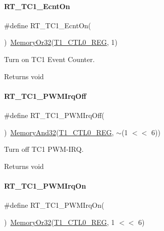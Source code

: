 \paragraph{\texorpdfstring{R\+T\+\_\+\+T\+C1\+\_\+\+Ecnt\+On}{RT\_TC1\_EcntOn}}
{\footnotesize\ttfamily \#define R\+T\+\_\+\+T\+C1\+\_\+\+Ecnt\+On(\begin{DoxyParamCaption}{ }\end{DoxyParamCaption})~\mbox{\hyperlink{a00026_a27874a97deab7cecdde5ddecf466e31e}{Memory\+Or32}}(\mbox{\hyperlink{a00026_a55600694c3c73a1019f78d306f474fa1}{T1\+\_\+\+C\+T\+L0\+\_\+\+R\+EG}}, 1)}



Turn on T\+C1 Event Counter. 

\begin{DoxyReturn}{Returns}
void 
\end{DoxyReturn}
\mbox{\label{a00080_a1c33903adfe470964d7eb5126c4ce7d4}} 
\paragraph{\texorpdfstring{R\+T\+\_\+\+T\+C1\+\_\+\+P\+W\+M\+Irq\+Off}{RT\_TC1\_PWMIrqOff}}
{\footnotesize\ttfamily \#define R\+T\+\_\+\+T\+C1\+\_\+\+P\+W\+M\+Irq\+Off(\begin{DoxyParamCaption}{ }\end{DoxyParamCaption})~\mbox{\hyperlink{a00026_ad87cedffcaadc51db22594fce55173d4}{Memory\+And32}}(\mbox{\hyperlink{a00026_a55600694c3c73a1019f78d306f474fa1}{T1\+\_\+\+C\+T\+L0\+\_\+\+R\+EG}}, $\sim$(1 $<$$<$ 6))}



Turn off T\+C1 P\+W\+M-\/\+I\+RQ. 

\begin{DoxyReturn}{Returns}
void 
\end{DoxyReturn}
\mbox{\label{a00080_a61477182241a8629176801cca44ce09a}} 
\paragraph{\texorpdfstring{R\+T\+\_\+\+T\+C1\+\_\+\+P\+W\+M\+Irq\+On}{RT\_TC1\_PWMIrqOn}}
{\footnotesize\ttfamily \#define R\+T\+\_\+\+T\+C1\+\_\+\+P\+W\+M\+Irq\+On(\begin{DoxyParamCaption}{ }\end{DoxyParamCaption})~\mbox{\hyperlink{a00026_a27874a97deab7cecdde5ddecf466e31e}{Memory\+Or32}}(\mbox{\hyperlink{a00026_a55600694c3c73a1019f78d306f474fa1}{T1\+\_\+\+C\+T\+L0\+\_\+\+R\+EG}}, 1 $<$$<$ 6)}



